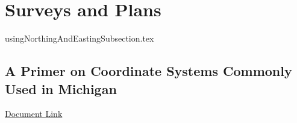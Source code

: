 %
%
%
%
% 
\section{Surveys and Plans}
{usingNorthingAndEastingSubsection.tex}
\subsection[Coordinate Systems for Michigan]{A Primer on Coordinate Systems Commonly Used in Michigan}
\href{../../../../documentation/references/geo101/MiCoordinateSystems.pdf}{Document Link}

